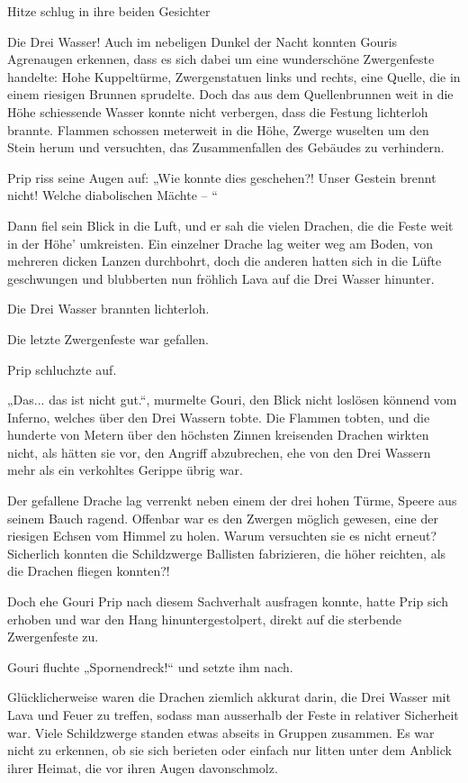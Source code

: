 Hitze schlug in ihre beiden Gesichter

Die Drei Wasser! Auch im nebeligen Dunkel der Nacht konnten Gouris Agrenaugen erkennen, dass es sich dabei um eine wunderschöne Zwergenfeste handelte: Hohe Kuppeltürme, Zwergenstatuen links und rechts, eine Quelle, die in einem riesigen Brunnen sprudelte. Doch das aus dem Quellenbrunnen weit in die Höhe schiessende Wasser konnte nicht verbergen, dass die Festung lichterloh brannte. Flammen schossen meterweit in die Höhe, Zwerge wuselten um den Stein herum und versuchten, das Zusammenfallen des Gebäudes zu verhindern.

Prip riss seine Augen auf: „Wie konnte dies geschehen?! Unser Gestein brennt nicht! Welche diabolischen Mächte – “

Dann fiel sein Blick in die Luft, und er sah die vielen Drachen, die die Feste weit in der Höhe’ umkreisten. Ein einzelner Drache lag weiter weg am Boden, von mehreren dicken Lanzen durchbohrt, doch die anderen hatten sich in die Lüfte geschwungen und blubberten nun fröhlich Lava auf die Drei Wasser hinunter.

Die Drei Wasser brannten lichterloh.

Die letzte Zwergenfeste war gefallen.

Prip schluchzte auf.

„Das... das ist nicht gut.“, murmelte Gouri, den Blick nicht loslösen könnend vom Inferno, welches über den Drei Wassern tobte. Die Flammen tobten, und die hunderte von Metern über den höchsten Zinnen kreisenden Drachen wirkten nicht, als hätten sie vor, den Angriff abzubrechen, ehe von den Drei Wassern mehr als ein verkohltes Gerippe übrig war.

Der gefallene Drache lag verrenkt neben einem der drei hohen Türme, Speere aus seinem Bauch ragend. Offenbar war es den Zwergen möglich gewesen, eine der riesigen Echsen vom Himmel zu holen. Warum versuchten sie es nicht erneut? Sicherlich konnten die Schildzwerge Ballisten fabrizieren, die höher reichten, als die Drachen fliegen konnten?!

Doch ehe Gouri Prip nach diesem Sachverhalt ausfragen konnte, hatte Prip sich erhoben und war den Hang hinuntergestolpert, direkt auf die sterbende Zwergenfeste zu.

Gouri fluchte „Spornendreck!“ und setzte ihm nach.

Glücklicherweise waren die Drachen ziemlich akkurat darin, die Drei Wasser mit Lava und Feuer zu treffen, sodass man ausserhalb der Feste in relativer Sicherheit war. Viele Schildzwerge standen etwas abseits in Gruppen zusammen. Es war nicht zu erkennen, ob sie sich berieten oder einfach nur litten unter dem Anblick ihrer Heimat, die vor ihren Augen davonschmolz.

